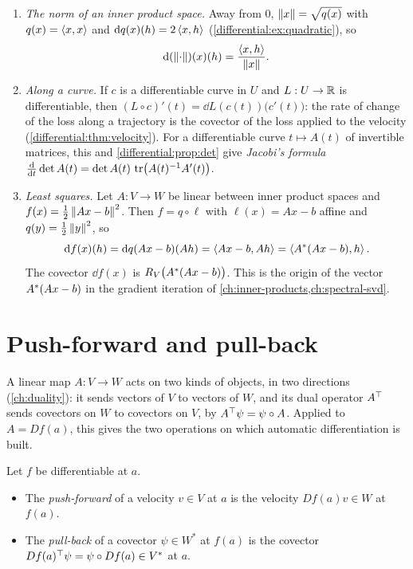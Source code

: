 \begin{notechapter}
\begin{example}\label{chain-rule-autodiff:ex:first}
\begin{enumerate}[nosep]
  \item \emph{The norm of an inner product space.} Away from $0$,
        $\left\|x\right\| = \sqrt{q(x)}$ with $q(x) = \left\langle x, x \right\rangle$ and
        $\mathrm{d} q(x)(h) = 2\left\langle x, h \right\rangle$ (\cref{differential:ex:quadratic}), so
        \[
          \mathrm{d}(\left\|\cdot\right\|)(x)(h) = \frac{\left\langle x, h \right\rangle}{\left\|x\right\|} .
        \]
  \item \emph{Along a curve.} If $c$ is a differentiable curve in $U$ and
        $L:U\to\mathbb{R}$ is differentiable, then
        $(L\circ c)'(t) = \dd L(c(t))\bigl(c'(t)\bigr)$: the rate of
        change of the loss along a trajectory is the covector of the loss
        applied to the velocity (\cref{differential:thm:velocity}). For a
        differentiable curve $t\mapsto A(t)$ of invertible matrices, this
        and \cref{differential:prop:det} give \emph{Jacobi's formula}
        $\frac{\mathrm{d}}{\mathrm{d} t}\det A(t)
        = \det A(t)\,\operatorname{tr}\bigl(A(t)^{-1}A'(t)\bigr)$.
  \item \emph{Least squares.} Let $A:V\to W$ be linear between inner
        product spaces and $f(x) = \frac12\left\|Ax - b\right\|^2$. Then
        $f = q\circ\ell$ with $\ell(x) = Ax - b$ affine and
        $q(y) = \frac12\left\|y\right\|^2$, so
        \[
          \mathrm{d} f(x)(h) = \mathrm{d} q(Ax - b)(Ah) = \left\langle Ax - b, Ah \right\rangle
          = \left\langle A^{*}(Ax - b), h \right\rangle .
        \]
        The covector $\dd f(x)$ is $R_V\bigl(A^{*}(Ax - b)\bigr)$. This
        is the origin of the vector $A^{*}(Ax - b)$ in the gradient
        iteration of \cref{ch:inner-products,ch:spectral-svd}.
\end{enumerate}
\end{example}

\section{Push-forward and pull-back}\label{chain-rule-autodiff:sec:push-pull}

A linear map $A:V\to W$ acts on two kinds of objects, in two directions
(\cref{ch:duality}): it sends vectors of $V$ to vectors of $W$, and its
dual operator $A^{\top}$ sends covectors on $W$ to covectors on $V$, by
$A^{\top}\psi = \psi\circ A$. Applied to $A = Df(a)$, this gives the two
operations on which automatic differentiation is built.

\begin{definition}
\label{chain-rule-autodiff:def:push-pull}
Let $f$ be differentiable at $a$.
\begin{itemize}[nosep]
  \item The \emph{push-forward} of a velocity $v\in V$ at $a$ is the
        velocity $Df(a)v\in W$ at $f(a)$.
  \item The \emph{pull-back} of a covector $\psi\in W^*$ at $f(a)$ is the
        covector $Df(a)^{\top}\psi = \psi\circ Df(a)\in V^*$ at $a$.
\end{itemize}
\end{definition}


\end{notechapter}
